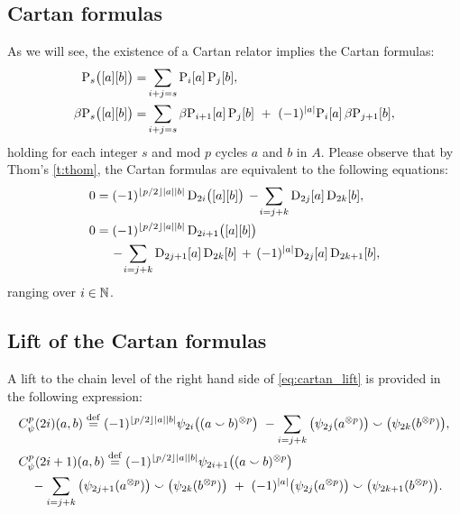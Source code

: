 \subsection{Cartan formulas}

As we will see, the existence of a Cartan relator implies the Cartan formulas:
\begin{align*}
	\mathrm{P}_s\big([a][b]\big) =&
	\sum_{i+j=s} \mathrm{P}_i[a] \, \mathrm{P}_j[b], \\
	\beta\mathrm{P}_s\big([a][b]\big) =&
	\sum_{i+j=s} \beta\mathrm{P}_{i+1}[a] \, \mathrm{P}_j[b] \ +\ (-1)^{\lvert a\rvert} \mathrm{P}_i[a] \, \beta\mathrm{P}_{j+1}[b],
\end{align*}
holding for each integer $s$ and mod $p$ cycles $a$ and $b$ in $A$.
Please observe that by Thom's \cref{t:thom}, the Cartan formulas are equivalent to the following equations:
\begin{equation}\label{eq:cartan_lift}
	\begin{split}
		0 &= (-1)^{\lfloor p/2\rfloor\lvert a\rvert\lvert b\rvert} \, \mathrm{D}_{2i}\big([a][b]\big) \,-\!
		\sum_{i=j+k} \mathrm{D}_{2j}[a] \, \mathrm{D}_{2k}[b], \\
		0 &= (-1)^{\lfloor p/2\rfloor\lvert a\rvert\lvert b\rvert} \, \mathrm{D}_{2i+1}\big([a][b]\big)  \\ & \quad
		\,-\!\sum_{i=j+k} \mathrm{D}_{2j+1}[a] \, \mathrm{D}_{2k}[b] \, +\, (-1)^{\lvert a\rvert}\mathrm{D}_{2j}[a] \, \mathrm{D}_{2k+1}[b],
	\end{split}
\end{equation}
ranging over $i \in \mathbb{N}$.

\subsection{Lift of the Cartan formulas}

A lift to the chain level of the right hand side of \cref{eq:cartan_lift} is provided in the following expression:
\begin{align*}
	&C_\psi^p(2i)(a,b) \stackrel{\mathrm{def}}{=} (-1)^{\lfloor p/2\rfloor\lvert a\rvert\lvert b\rvert} \psi_{2i}\big((a \smallsmile b)^{\otimes p}\big) \ -
	\sum_{i=j+k}\big(\psi_{2j}(a^{\otimes p})\big) \smallsmile \big(\psi_{2k}(b^{\otimes p})\big), \\
	&C_\psi^p(2i+1)(a,b) \stackrel{\mathrm{def}}{=} (-1)^{\lfloor p/2\rfloor\lvert a\rvert\lvert b\rvert} \psi_{2i+1}\big((a \smallsmile b)^{\otimes p}\big) \\
	&\quad -\sum_{i=j+k} \big(\psi_{2j+1}(a^{\otimes p})\big) \smallsmile \big(\psi_{2k}(b^{\otimes p})\big)\ +\
	(-1)^{\lvert a\rvert}\big(\psi_{2j}(a^{\otimes p})\big) \smallsmile \big(\psi_{2k+1}(b^{\otimes p})\big).
\end{align*}
%
%


